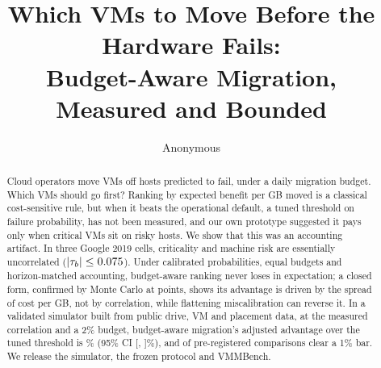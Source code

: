 \documentclass[sigconf, review, anonymous]{acmart}
\begin{document}
\title{Which VMs to Move Before the Hardware Fails:\\Budget-Aware Migration, Measured and Bounded}
\author{Anonymous}

\begin{abstract}
Cloud operators move VMs off hosts predicted to fail, under a daily migration budget. Which VMs
should go first? Ranking by expected benefit per GB moved is a classical cost-sensitive rule, but
when it beats the operational default, a tuned threshold on failure probability, has not been
measured, and our own prototype suggested it pays only when critical VMs sit on risky hosts. We
show that this was an accounting artifact. In three Google 2019 cells, criticality and machine risk
are essentially uncorrelated ($|\tau_b| \le 0.075$). Under calibrated probabilities,
equal budgets and horizon-matched accounting, budget-aware ranking never loses in expectation; a
closed form, confirmed by Monte Carlo at \VTheoryPoints{} points, shows its advantage is driven by
the spread of cost per GB, not by correlation, while flattening miscalibration can reverse it. In
a validated simulator built from public drive, VM and placement data, at the measured
correlation and a 2\% budget, budget-aware migration's adjusted advantage over the tuned threshold
is \VDeltaPFourBOneTwo\% (95\% CI [\VCILoPFourBOneTwo, \VCIHiPFourBOneTwo]\%), and \VWins{} of
\VFamilySize{} pre-registered comparisons clear a 1\% bar. We release the simulator, the frozen
protocol and VMMBench.
\end{abstract}

\maketitle
















\appendix

\end{document}
